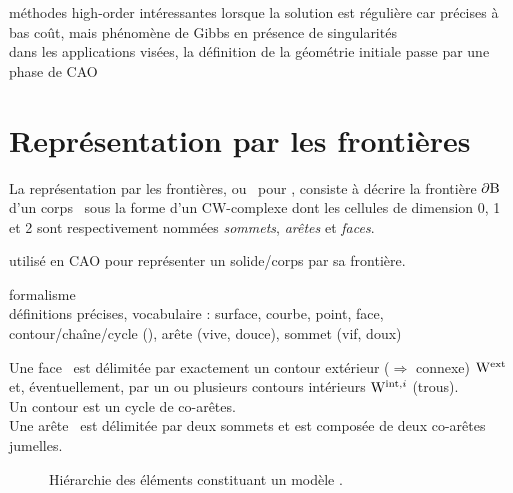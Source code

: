 méthodes high-order intéressantes lorsque la solution est régulière car précises à bas coût, mais phénomène de Gibbs en présence de singularités \cite{bruno2007}\\

dans les applications visées, la définition de la géométrie initiale passe par une phase de CAO


\section{Représentation par les frontières}
La représentation par les frontières, ou \brep\ pour , consiste à décrire la frontière $\partial\mathrm{B}$ d'un corps \brepbody\ sous la forme d'un CW-complexe dont les cellules de dimension 0, 1 et 2 sont respectivement nommées \textit{sommets}, \textit{arêtes} et \textit{faces}.




utilisé en CAO pour représenter un solide/corps par sa frontière.
\par\bigskip

formalisme \brep~ \cite[Section 2.2]{pentcheva2010}\\
définitions précises, vocabulaire : surface, courbe, point, face, contour/chaîne/cycle (), arête (vive, douce), sommet (vif, doux)
\par\bigskip
Une face \brepface\ est délimitée par exactement un contour extérieur ($\Rightarrow$ connexe) $\mathrm{W}^{\mathrm{ext}}$ et, éventuellement, par un ou plusieurs contours intérieurs $\mathrm{W}^{\mathrm{int},i}$ (trous).\\
Un contour est un cycle de co-arêtes.\\
Une arête \brepedge\ est délimitée par deux sommets et est composée de deux co-arêtes jumelles.\\


\begin{figure}
\centering

\caption{Hiérarchie des éléments constituant un modèle \brep.}
\end{figure}



